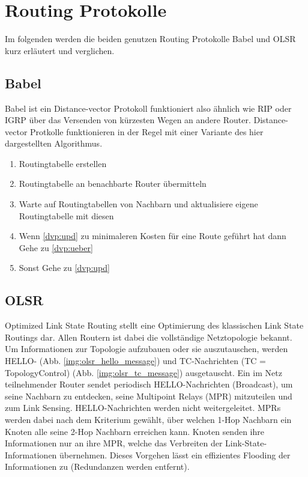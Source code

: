 \documentclass[10pt]{scrartcl}
\begin{document}
	
		
		
	
	
\section{Routing Protokolle}
	Im folgenden werden die beiden genutzen Routing Protokolle Babel und OLSR kurz erläutert und verglichen.
	
	\subsection{Babel}
	Babel ist ein Distance-vector Protokoll funktioniert also ähnlich wie RIP oder IGRP über das Versenden von kürzesten Wegen an andere Router. Distance-vector Protkolle funktionieren in der Regel mit einer Variante des hier dargestellten Algorithmus.
	
	\begin{enumerate}
		\item Routingtabelle erstellen
		\item \label{dvp:ueber} Routingtabelle an benachbarte Router übermitteln
		\item \label{dvp:upd} Warte auf Routingtabellen von Nachbarn und aktualisiere eigene Routingtabelle mit diesen
		\item Wenn \ref{dvp:upd} zu minimaleren Kosten für eine Route geführt hat dann
			\subitem Gehe zu \ref{dvp:ueber}
		\item Sonst
			\subitem Gehe zu \ref{dvp:upd}
	\end{enumerate}
	
	
	\subsection{OLSR}
    Optimized Link State Routing stellt eine Optimierung des klassischen Link State Routings dar. Allen Routern ist dabei die vollständige Netztopologie bekannt. Um Informationen zur Topologie aufzubauen oder sie auszutauschen, werden HELLO- (Abb. \ref{img:olsr_hello_message}) und TC-Nachrichten (TC = TopologyControl) (Abb. \ref{img:olsr_tc_message}) ausgetauscht. Ein im Netz teilnehmender Router sendet periodisch HELLO-Nachrichten (Broadcast), um seine Nachbarn zu entdecken, seine Multipoint Relays (MPR) mitzuteilen und zum Link Sensing. HELLO-Nachrichten werden nicht weitergeleitet. MPRs werden dabei nach dem Kriterium gewählt, über welchen 1-Hop Nachbarn ein Knoten alle seine 2-Hop Nachbarn erreichen kann.
Knoten senden ihre Informationen nur an ihre MPR, welche das Verbreiten der Link-State-Informationen übernehmen. Dieses Vorgehen lässt ein effizientes Flooding der Informationen zu (Redundanzen werden entfernt).
\end{document}
